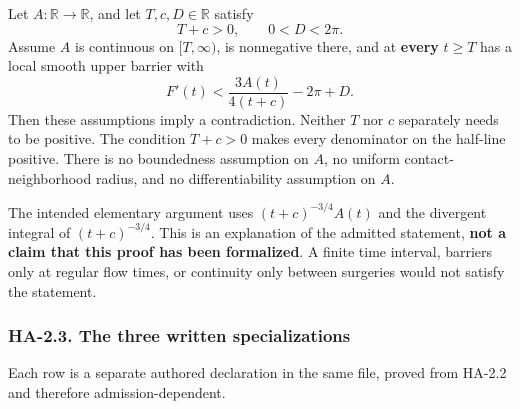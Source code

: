 \documentclass[
  letterpaper,
  11pt]{article}
\begin{document}
Let \(A:\mathbb R\to\mathbb R\), and let \(T,c,D\in\mathbb R\) satisfy
\[
 T+c>0,\qquad 0<D<2\pi.
\] Assume \(A\) is continuous on \([T,\infty)\), is nonnegative there,
and at \textbf{every} \(t\ge T\) has a local smooth upper barrier with
\[
 F'(t)<\frac{3A(t)}{4(t+c)}-2\pi+D.
\] Then these assumptions imply a contradiction. Neither \(T\) nor \(c\)
separately needs to be positive. The condition \(T+c>0\) makes every
denominator on the half-line positive. There is no boundedness
assumption on \(A\), no uniform contact-neighborhood radius, and no
differentiability assumption on \(A\).

The intended elementary argument uses \((t+c)^{-3/4}A(t)\) and the
divergent integral of \((t+c)^{-3/4}\). This is an explanation of the
admitted statement, \textbf{not a claim that this proof has been
formalized}. A finite time interval, barriers only at regular flow
times, or continuity only between surgeries would not satisfy the
statement.

\subsubsection{HA-2.3. The three written specializations}\label{ha-2-3}

Each row is a separate authored declaration in the same file, proved
from HA-2.2 and therefore admission-dependent.
\end{document}
